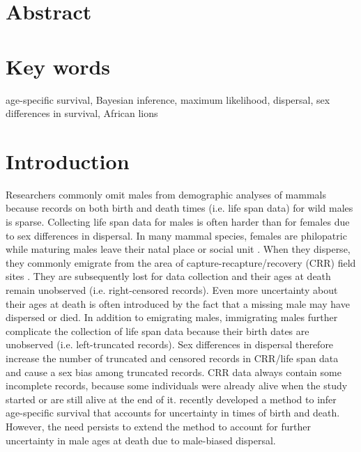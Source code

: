 \section*{Abstract}
%
\section*{Key words}
age-specific survival, Bayesian inference, maximum likelihood, dispersal, sex differences in survival, African lions
%
\section*{Introduction}
Researchers commonly omit males from demographic analyses of mammals because records on both birth and death times (i.e. life span data) for wild males is sparse. Collecting life span data for males is often harder than for females due to sex differences in dispersal. In many mammal species, females are philopatric while maturing males leave their natal place or social unit \citep{ Greenwood:1980bp, Handley:2007tu}. When they disperse, they commonly emigrate from the area of capture-recapture/recovery (CRR) field sites \citep[e.g.][]{Pusey:1987vc}. They are subsequently lost for data collection and their ages at death remain unobserved (i.e. right-censored records). Even more uncertainty about their ages at death is often introduced by the fact that a missing male may have dispersed or died. In addition to emigrating males, immigrating males further complicate the collection of life span data because their birth dates are unobserved (i.e. left-truncated records). Sex differences in dispersal therefore increase the number of truncated and censored records in CRR/life span data and cause a sex bias among truncated records. CRR data always contain some incomplete records, because some individuals were already alive when the study started or are still alive at the end of it. \citet{Colchero:2012bf} recently developed a method to infer age-specific survival that accounts for uncertainty in times of birth and death. However, the need persists to extend the method to account for further uncertainty in male ages at death due to male-biased dispersal.


